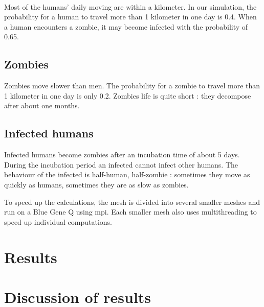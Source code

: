 \documentclass{report}
\begin{document}
\paragraph{}
Most of the humans' daily moving are within a kilometer. In our simulation, the probability for a human to travel more than 1 kilometer in one day is 0.4. When a human encounters a zombie, it may become infected with the probability of 0.65.

\subsection{Zombies}
Zombies move slower than men. The probability for a zombie to travel more than 1 kilometer in one day is only 0.2. Zombies life is quite short : they decompose after about one months.

\subsection{Infected humans}
Infected humans become zombies after an incubation time of about 5 days. During the incubation period an infected cannot infect other humans. The behaviour of the infected is half-human, half-zombie : sometimes they move as quickly as humans, sometimes they are as slow as zombies.



To speed up the calculations, the mesh is divided into several smaller meshes and run on a Blue Gene Q using mpi. Each smaller mesh also uses multithreading to speed up individual computations.







\section{Results}


\section{Discussion of results}
\end{document}
